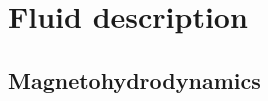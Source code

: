 \documentclass[oneside,a4paper,11pt]{report}
\begin{document}


%
%
\part{Fluid description}
%
%

\chapter{Magnetohydrodynamics}
\end{document}
